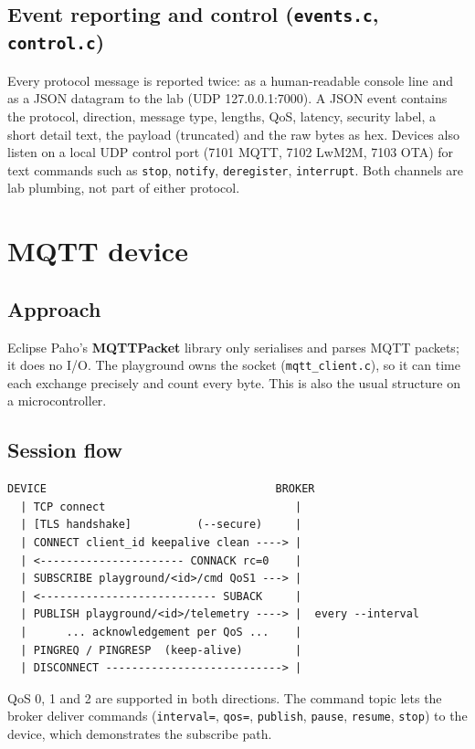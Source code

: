 \documentclass[11pt,a4paper]{article}
\newcommand{\code}[1]{\texttt{#1}}
\begin{document}
\subsection{Event reporting and control (\code{events.c}, \code{control.c})}
Every protocol message is reported twice: as a human-readable console line and
as a JSON datagram to the lab (UDP 127.0.0.1:7000). A JSON event contains the
protocol, direction, message type, lengths, QoS, latency, security label, a
short detail text, the payload (truncated) and the raw bytes as hex. Devices
also listen on a local UDP control port (7101 MQTT, 7102 LwM2M, 7103 OTA) for
text commands such as \code{stop}, \code{notify}, \code{deregister},
\code{interrupt}. Both channels are lab plumbing, not part of either protocol.

\section{MQTT device}

\subsection{Approach}
Eclipse Paho's \textbf{MQTTPacket} library only serialises and parses MQTT
packets; it does no I/O. The playground owns the socket
(\code{mqtt\_client.c}), so it can time each exchange precisely and count
every byte. This is also the usual structure on a microcontroller.

\subsection{Session flow}
\begin{lstlisting}
DEVICE                                   BROKER
  | TCP connect                             |
  | [TLS handshake]          (--secure)     |
  | CONNECT client_id keepalive clean ----> |
  | <---------------------- CONNACK rc=0    |
  | SUBSCRIBE playground/<id>/cmd QoS1 ---> |
  | <--------------------------- SUBACK     |
  | PUBLISH playground/<id>/telemetry ----> |  every --interval
  |      ... acknowledgement per QoS ...    |
  | PINGREQ / PINGRESP  (keep-alive)        |
  | DISCONNECT ---------------------------> |
\end{lstlisting}
QoS 0, 1 and 2 are supported in both directions. The command topic lets the
broker deliver commands (\code{interval=}, \code{qos=}, \code{publish},
\code{pause}, \code{resume}, \code{stop}) to the device, which demonstrates the
subscribe path.
\end{document}
